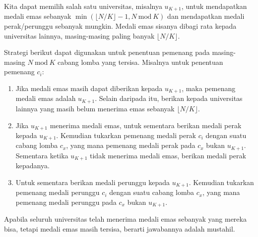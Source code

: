 \documentclass[../main_editorial.tex]{subfiles} %
\newcommand{\Mod}[1]{\ \mathrm{mod}\ #1}
\begin{document}
Kita dapat memilih salah satu universitas, misalnya $u_{K+1}$, untuk mendapatkan medali emas sebanyak $\min{(\lfloor N / K \rfloor - 1, N \Mod K)}$ dan mendapatkan medali perak/perunggu sebanyak mungkin. Medali emas sisanya dibagi rata kepada universitas lainnya, masing-masing paling banyak $\lfloor N / K \rfloor$.

Strategi berikut dapat digunakan untuk penentuan pemenang pada masing-masing $N \Mod K$ cabang lomba yang tersisa. Misalnya untuk penentuan pemenang $c_i$:
\begin{enumerate}
  \item Jika medali emas masih dapat diberikan kepada $u_{K+1}$, maka pemenang medali emas adalah $u_{K+1}$. Selain daripada itu, berikan kepada universitas lainnya yang masih belum menerima emas sebanyak $\lfloor N / K \rfloor$.
  \item Jika $u_{K+1}$ menerima medali emas, untuk sementara berikan medali perak kepada $u_{K+1}$. Kemudian tukarkan pemenang medali perak $c_i$ dengan suatu cabang lomba $c_x$, yang mana pemenang medali perak pada $c_x$ bukan $u_{K+1}$. Sementara ketika $u_{K+1}$ tidak menerima medali emas, berikan medali perak kepadanya.
  \item Untuk sementara berikan medali perunggu kepada $u_{K+1}$. Kemudian tukarkan pemenang medali perunggu $c_i$ dengan suatu cabang lomba $c_x$, yang mana pemenang medali perunggu pada $c_x$ bukan $u_{K+1}$.
\end{enumerate}

Apabila seluruh universitas telah menerima medali emas sebanyak yang mereka bisa, tetapi medali emas masih tersisa, berarti jawabannya adalah mustahil.
\end{document}
